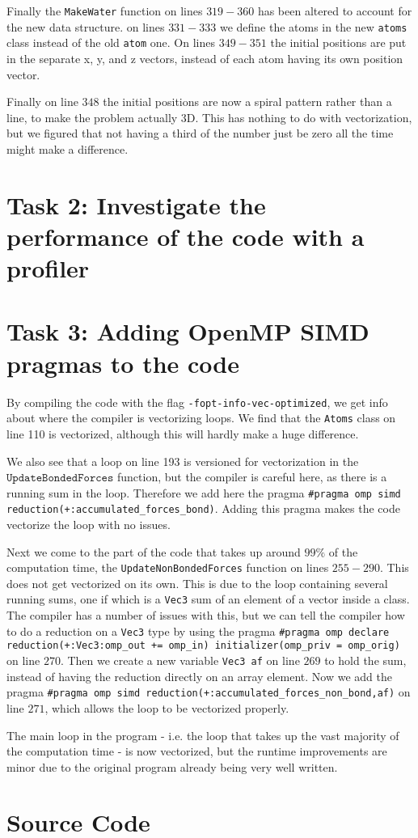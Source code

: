 \documentclass{article}
\begin{document}
Finally the \texttt{MakeWater} function on lines $319-360$ has been altered to account for the new data structure. on lines $331-333$ we define the atoms in the new \texttt{atoms} class instead of the old \texttt{atom} one. On lines $349-351$ the initial positions are put in the separate x, y, and z vectors, instead of each atom having its own position vector. 

Finally on line $348$ the initial positions are now a spiral pattern rather than a line, to make the problem actually 3D. This has nothing to do with vectorization, but we figured that not having a third of the number just be zero all the time might make a difference.

\section{Task 2: Investigate the performance of the code with a profiler}

\section{Task 3: Adding OpenMP SIMD pragmas to the code}
By compiling the code with the flag \texttt{-fopt-info-vec-optimized}, we get info about where the compiler is vectorizing loops. We find that the \texttt{Atoms} class on line 110 is vectorized, although this will hardly make a huge difference. 

We also see that a loop on line 193 is versioned for vectorization in the $\texttt{UpdateBondedForces}$ function, but the compiler is careful here, as there is a running sum in the loop. Therefore we add here the pragma \texttt{\#pragma omp simd reduction(+:accumulated\_forces\_bond)}. Adding this pragma makes the code vectorize the loop with no issues.

Next we come to the part of the code that takes up around $99\%$ of the computation time, the \texttt{UpdateNonBondedForces} function on lines $255-290$. This does not get vectorized on its own. This is due to the loop containing several running sums, one if which is a \texttt{Vec3} sum of an element of a vector inside a class. The compiler has a number of issues with this, but we can tell the compiler how to do a reduction on a \texttt{Vec3} type by using the pragma \texttt{\#pragma omp declare reduction(+:Vec3:omp\_out += omp\_in) initializer(omp\_priv = omp\_orig)} on line $270$. Then we create a new variable \texttt{Vec3 af} on line $269$ to hold the sum, instead of having the reduction directly on an array element. Now we add the pragma \texttt{\#pragma omp simd reduction(+:accumulated\_forces\_non\_bond,af)} on line $271$, which allows the loop to be vectorized properly. 

The main loop in the program - i.e. the loop that takes up the vast majority of the computation time - is now vectorized, but the runtime improvements are minor due to the original program already being very well written.

\section*{Source Code}
%
\end{document}
